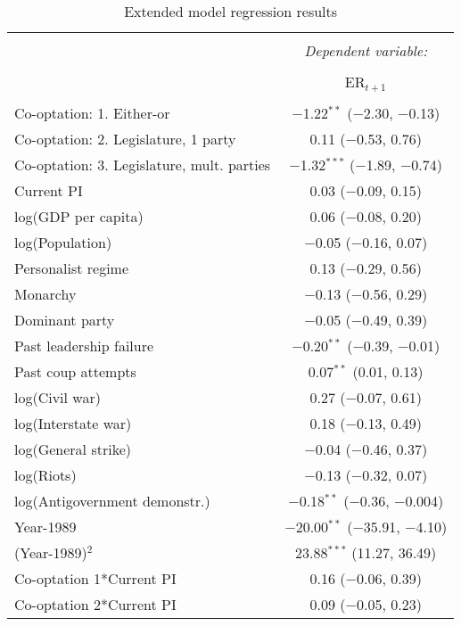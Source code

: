 
\begin{table}[!htbp] \centering 
  \caption{Extended model regression results} 
  \label{} 
\begin{tabular}{@{\extracolsep{5pt}}lc} 
\\[-1.8ex]\hline 
\hline \\[-1.8ex] 
 & \multicolumn{1}{c}{\textit{Dependent variable:}} \\ 
\cline{2-2} 
\\[-1.8ex] & ER$_{t+1}$ \\ 
\hline \\[-1.8ex] 
 Co-optation: 1. Either-or & $-$1.22$^{**}$ ($-$2.30, $-$0.13) \\ 
  Co-optation: 2. Legislature, 1 party & 0.11 ($-$0.53, 0.76) \\ 
  Co-optation: 3. Legislature, mult. parties & $-$1.32$^{***}$ ($-$1.89, $-$0.74) \\ 
  Current PI & 0.03 ($-$0.09, 0.15) \\ 
  log(GDP per capita) & 0.06 ($-$0.08, 0.20) \\ 
  log(Population) & $-$0.05 ($-$0.16, 0.07) \\ 
  Personalist regime & 0.13 ($-$0.29, 0.56) \\ 
  Monarchy & $-$0.13 ($-$0.56, 0.29) \\ 
  Dominant party & $-$0.05 ($-$0.49, 0.39) \\ 
  Past leadership failure & $-$0.20$^{**}$ ($-$0.39, $-$0.01) \\ 
  Past coup attempts & 0.07$^{**}$ (0.01, 0.13) \\ 
  log(Civil war) & 0.27 ($-$0.07, 0.61) \\ 
  log(Interstate war) & 0.18 ($-$0.13, 0.49) \\ 
  log(General strike) & $-$0.04 ($-$0.46, 0.37) \\ 
  log(Riots) & $-$0.13 ($-$0.32, 0.07) \\ 
  log(Antigovernment demonstr.) & $-$0.18$^{**}$ ($-$0.36, $-$0.004) \\ 
  Year-1989 & $-$20.00$^{**}$ ($-$35.91, $-$4.10) \\ 
  (Year-1989)$^2$ & 23.88$^{***}$ (11.27, 36.49) \\ 
  Co-optation 1*Current PI & 0.16 ($-$0.06, 0.39) \\ 
  Co-optation 2*Current PI & 0.09 ($-$0.05, 0.23) \\ 

\end{tabular}
\end{table}
